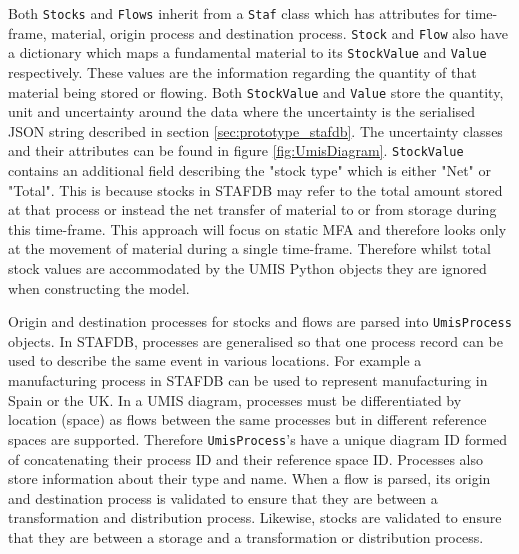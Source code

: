 \documentclass[ %
                    author={Tom Jager},
                supervisor={Dr. Daniel Schien},
                    degree={MEng},
                     title={A Bayesian Inference Engine for Calibrating Uncertainty over UMIS Structured MFA Systems},
                  subtitle={},
                      type={research},
                      year={2019} ]{dissertation}
\begin{document}
Both \texttt{Stocks} and \texttt{Flows} inherit from a \texttt{Staf} class which has attributes for time-frame, material, origin process and destination process. \texttt{Stock} and \texttt{Flow} also have a dictionary which maps a fundamental material to its \texttt{StockValue} and \texttt{Value} respectively. These values are the information regarding the quantity of that material being stored or flowing. Both \texttt{StockValue} and \texttt{Value} store the quantity, unit and uncertainty around the data where the uncertainty is the serialised JSON string described in section \ref{sec:prototype_stafdb}. The uncertainty classes and their attributes can be found in figure \ref{fig:UmisDiagram}. \texttt{StockValue} contains an additional field describing the "stock type" which is either "Net" or "Total". This is because stocks in STAFDB may refer to the total amount stored at that process or instead the net transfer of material to or from storage during this time-frame. This approach will focus on static MFA and therefore looks only at the movement of material during a single time-frame. Therefore whilst total stock values are accommodated by the UMIS Python objects they are ignored when constructing the model.

Origin and destination processes for stocks and flows are parsed into \texttt{UmisProcess} objects. In STAFDB, processes are generalised so that one process record can be used to describe the same event in various locations. For example a manufacturing process in STAFDB can be used to represent manufacturing in Spain or the UK. In a UMIS diagram, processes must be differentiated by location (space) as flows between the same processes but in different reference spaces are supported. Therefore \texttt{UmisProcess}'s have a unique diagram ID formed of concatenating their process ID and their reference space ID. Processes also store information about their type and name. When a flow is parsed, its origin and destination process is validated to ensure that they are between a transformation and distribution process. Likewise, stocks are validated to ensure that they are between a storage and a transformation or distribution process.
\end{document}
